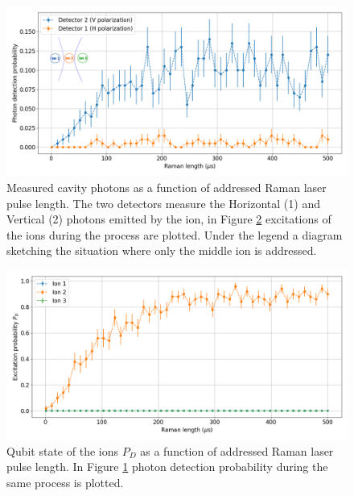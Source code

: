 \begin{figure}[H]
\centering
\includegraphics[width=\textwidth]{img/photonefficency_witherror3}
\caption{Measured cavity photons as a function of addressed Raman laser pulse length. The two detectors measure the Horizontal (1) and Vertical (2) photons emitted by the ion, in Figure \ref{probion} excitations of the ions during the process are plotted. Under the legend a diagram sketching the situation where only the middle ion is addressed.}
\label{probphoton}
\end{figure}
\begin{figure}[H]
\centering
\includegraphics[width=\textwidth]{img/ramanlength_witherrors2}
\caption{Qubit state of the ions $P_D$ as a function of addressed Raman laser pulse length. In Figure \ref{probphoton} photon detection probability during the same process is plotted.}
\label{probion}
\end{figure}
